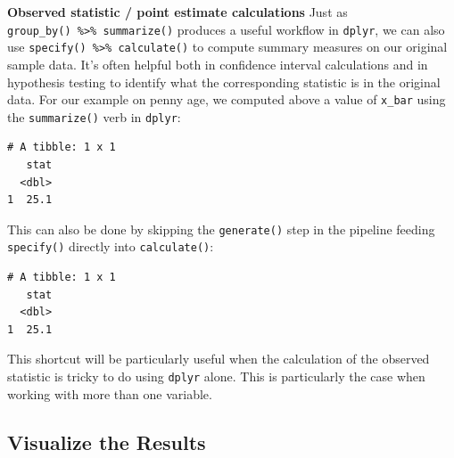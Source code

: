 \documentclass[]{article}
\newenvironment{Shaded}{\begin{snugshade}}{\end{snugshade}}
\newcommand{\KeywordTok}[1]{\textcolor[rgb]{0.13,0.29,0.53}{\textbf{#1}}}
\newcommand{\DataTypeTok}[1]{\textcolor[rgb]{0.13,0.29,0.53}{#1}}
\newcommand{\DecValTok}[1]{\textcolor[rgb]{0.00,0.00,0.81}{#1}}
\newcommand{\StringTok}[1]{\textcolor[rgb]{0.31,0.60,0.02}{#1}}
\newcommand{\OperatorTok}[1]{\textcolor[rgb]{0.81,0.36,0.00}{\textbf{#1}}}
\newcommand{\NormalTok}[1]{#1}
\begin{document}
\textbf{Observed statistic / point estimate calculations} Just as
\texttt{group\_by()\ \%\textgreater{}\%\ summarize()} produces a useful
workflow in \texttt{dplyr}, we can also use
\texttt{specify()\ \%\textgreater{}\%\ calculate()} to compute summary
measures on our original sample data. It's often helpful both in
confidence interval calculations and in hypothesis testing to identify
what the corresponding statistic is in the original data. For our
example on penny age, we computed above a value of \texttt{x\_bar} using
the \texttt{summarize()} verb in \texttt{dplyr}:

\begin{Shaded}
\end{Shaded}

\begin{verbatim}
# A tibble: 1 x 1
   stat
  <dbl>
1  25.1
\end{verbatim}

This can also be done by skipping the \texttt{generate()} step in the
pipeline feeding \texttt{specify()} directly into \texttt{calculate()}:

\begin{Shaded}
\end{Shaded}

\begin{verbatim}
# A tibble: 1 x 1
   stat
  <dbl>
1  25.1
\end{verbatim}

This shortcut will be particularly useful when the calculation of the
observed statistic is tricky to do using \texttt{dplyr} alone. This is
particularly the case when working with more than one variable.

\subsection{Visualize the Results}\label{visualize-the-results}
\end{document}
